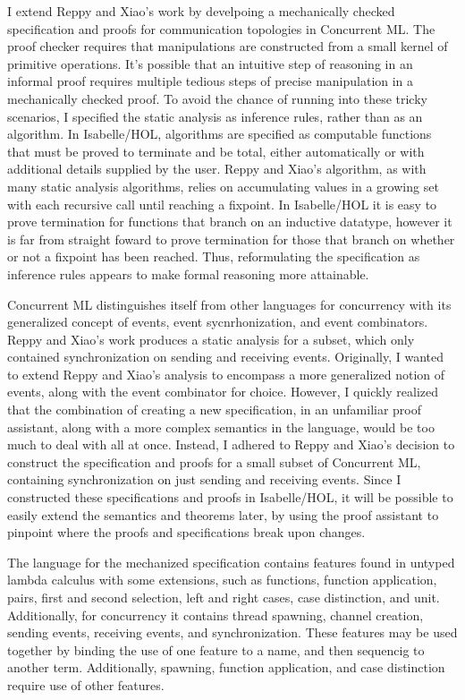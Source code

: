 \documentclass[letterpaper, 11pt]{report}
\begin{document}
I extend Reppy and Xiao's work by develpoing a mechanically checked specification and proofs
for communication topologies in Concurrent ML. The proof checker requires that manipulations are
constructed from a small kernel of primitive operations. It's possible that an intuitive step of reasoning in an
informal proof requires multiple tedious steps of precise manipulation in a mechanically checked proof.
To avoid the chance of running into these tricky scenarios, I specified the static analysis
as inference rules, rather than as an algorithm. In Isabelle/HOL, algorithms are specified as computable functions
that must be proved to terminate and be total, either automatically or with additional details supplied by the user.
Reppy and Xiao's algorithm, as with many static analysis algorithms, relies on accumulating values in a growing set
with each recursive call until reaching a fixpoint.
In Isabelle/HOL it is easy to prove termination for functions that branch on an inductive datatype, 
however it is far from straight foward to prove termination for those that branch on
whether or not a fixpoint has been reached. Thus, reformulating the specification as inference rules
appears to make formal reasoning more attainable. 

Concurrent ML distinguishes itself from other languages for concurrency with its generalized concept of events,
event sycnrhonization, and event combinators. Reppy and Xiao's work produces a static analysis for a subset,
which only contained synchronization on sending and receiving events. Originally, I wanted to extend Reppy and Xiao's
analysis to encompass a more generalized notion of events, along with the event combinator for choice.
However, I quickly
realized that the combination of creating a new specification, in an unfamiliar proof assistant, along with a more complex
semantics in the language, would be too much to deal with all at once. Instead, I adhered to Reppy and Xiao's decision
to construct the specification and proofs for a small subset of Concurrent ML, containing synchronization on just
sending and receiving events. Since I constructed these specifications and proofs in Isabelle/HOL, it will be possible
to easily extend the semantics and theorems later, by using the proof assistant to pinpoint where the proofs and
specifications break upon changes.

The language for the mechanized specification contains features found in untyped lambda calculus with
some extensions, such as functions, function application, pairs, first and second selection, left and right cases, case distinction, 
and unit. 
Additionally, for concurrency it contains thread spawning, channel creation, sending events, receiving events, and synchronization.
These features may be used together by binding the use of one feature to a name, and then
sequencig to another term. Additionally, spawning, function application, and case distinction require use of other features.
\end{document}
